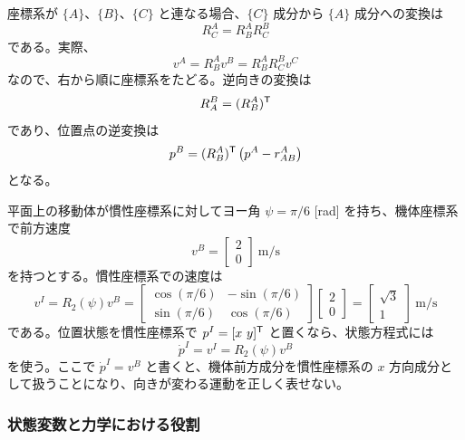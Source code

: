 座標系が $\{A\}$、$\{B\}$、$\{C\}$ と連なる場合、$\{C\}$ 成分から $\{A\}$ 成分への変換は
\begin{equation}
  R^A_C=R^A_B R^B_C
\end{equation}
である。実際、
\begin{equation}
  v^A=R^A_B v^B=R^A_B R^B_C v^C
\end{equation}
なので、右から順に座標系をたどる。逆向きの変換は
\begin{equation}
  R^B_A=(R^A_B)^{\mathsf{T}}
\end{equation}
であり、位置点の逆変換は
\begin{equation}
  p^B=(R^A_B)^{\mathsf{T}}\left(p^A-r^A_{AB}\right)
\end{equation}
となる。

\begin{example}[平面移動体の速度変換]
平面上の移動体が慣性座標系に対してヨー角 $\psi=\pi/6$ [rad] を持ち、機体座標系で前方速度
\begin{equation}
  v^B=
  \begin{bmatrix}2\\0\end{bmatrix}\ \mathrm{m/s}
\end{equation}
を持つとする。慣性座標系での速度は
\begin{equation}
  v^I=R_2(\psi)v^B
  =
  \begin{bmatrix}
    \cos(\pi/6)&-\sin(\pi/6)\\
    \sin(\pi/6)& \cos(\pi/6)
  \end{bmatrix}
  \begin{bmatrix}2\\0\end{bmatrix}
  =
  \begin{bmatrix}\sqrt{3}\\1\end{bmatrix}\ \mathrm{m/s}
\end{equation}
である。位置状態を慣性座標系で $p^I=[x\ y]^\T$ と置くなら、状態方程式には
\begin{equation}
  \dot{p}^I=v^I=R_2(\psi)v^B
\end{equation}
を使う。ここで $\dot{p}^I=v^B$ と書くと、機体前方成分を慣性座標系の $x$ 方向成分として扱うことになり、向きが変わる運動を正しく表せない。
\end{example}

\subsubsection{状態変数と力学における役割}

